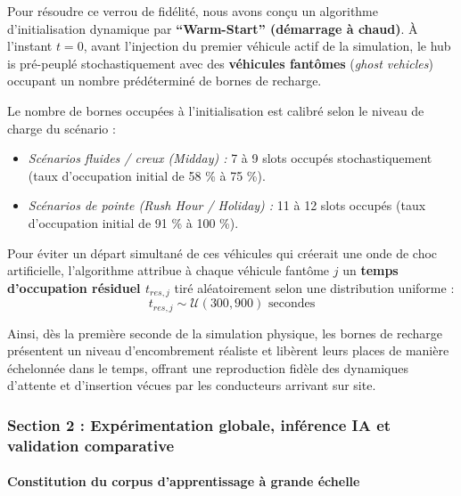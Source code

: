 \documentclass[10pt, a4paper]{article}
\providecommand{\tightlist}{}
\begin{document}
Pour résoudre ce verrou de fidélité, nous avons conçu un algorithme
d'initialisation dynamique par \textbf{``Warm-Start'' (démarrage à
chaud)}. À l'instant \(t=0\), avant l'injection du premier véhicule
actif de la simulation, le hub is pré-peuplé stochastiquement avec des
\textbf{véhicules fantômes} (\emph{ghost vehicles}) occupant un nombre
prédéterminé de bornes de recharge.

Le nombre de bornes occupées à l'initialisation est calibré selon le
niveau de charge du scénario :

\begin{itemize}
\tightlist
\item
  \emph{Scénarios fluides / creux (Midday) :} 7 à 9 slots occupés
  stochastiquement (taux d'occupation initial de 58 \% à 75 \%).
\item
  \emph{Scénarios de pointe (Rush Hour / Holiday) :} 11 à 12 slots
  occupés (taux d'occupation initial de 91 \% à 100 \%).
\end{itemize}

Pour éviter un départ simultané de ces véhicules qui créerait une onde
de choc artificielle, l'algorithme attribue à chaque véhicule fantôme
\(j\) un \textbf{temps d'occupation résiduel \(t_{res, j}\)} tiré
aléatoirement selon une distribution uniforme :
\[t_{res, j} \sim \mathcal{U}(300, 900) \text{ secondes}\]

Ainsi, dès la première seconde de la simulation physique, les bornes de
recharge présentent un niveau d'encombrement réaliste et libèrent leurs
places de manière échelonnée dans le temps, offrant une reproduction
fidèle des dynamiques d'attente et d'insertion vécues par les
conducteurs arrivant sur site.

\subsubsection{Section 2 : Expérimentation globale, inférence IA et
validation
comparative}\label{section-2-expuxe9rimentation-globale-infuxe9rence-ia-et-validation-comparative}

\paragraph{Constitution du corpus d'apprentissage à grande
échelle}\label{constitution-du-corpus-dapprentissage-uxe0-grande-uxe9chelle}
\end{document}

